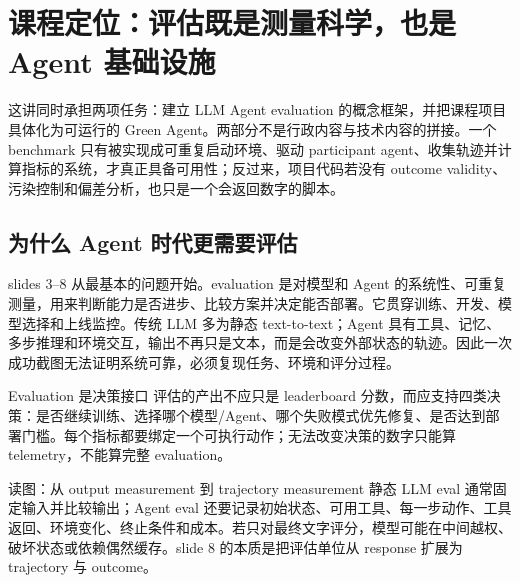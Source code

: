 \section{课程定位：评估既是测量科学，也是 Agent 基础设施}

这讲同时承担两项任务：建立 LLM Agent evaluation 的概念框架，并把课程项目具体化为可运行的 Green Agent。两部分不是行政内容与技术内容的拼接。一个 benchmark 只有被实现成可重复启动环境、驱动 participant agent、收集轨迹并计算指标的系统，才真正具备可用性；反过来，项目代码若没有 outcome validity、污染控制和偏差分析，也只是一个会返回数字的脚本。

\subsection{为什么 Agent 时代更需要评估}

slides 3--8 从最基本的问题开始。evaluation 是对模型和 Agent 的系统性、可重复测量，用来判断能力是否进步、比较方案并决定能否部署。它贯穿训练、开发、模型选择和上线监控。传统 LLM 多为静态 text-to-text；Agent 具有工具、记忆、多步推理和环境交互，输出不再只是文本，而是会改变外部状态的轨迹。因此一次成功截图无法证明系统可靠，必须复现任务、环境和评分过程。


\begin{importantbox}{Evaluation 是决策接口}
评估的产出不应只是 leaderboard 分数，而应支持四类决策：是否继续训练、选择哪个模型/Agent、哪个失败模式优先修复、是否达到部署门槛。每个指标都要绑定一个可执行动作；无法改变决策的数字只能算 telemetry，不能算完整 evaluation。
\end{importantbox}

\begin{knowledgebox}{读图：从 output measurement 到 trajectory measurement}
静态 LLM eval 通常固定输入并比较输出；Agent eval 还要记录初始状态、可用工具、每一步动作、工具返回、环境变化、终止条件和成本。若只对最终文字评分，模型可能在中间越权、破坏状态或依赖偶然缓存。slide 8 的本质是把评估单位从 response 扩展为 trajectory 与 outcome。
\end{knowledgebox}

